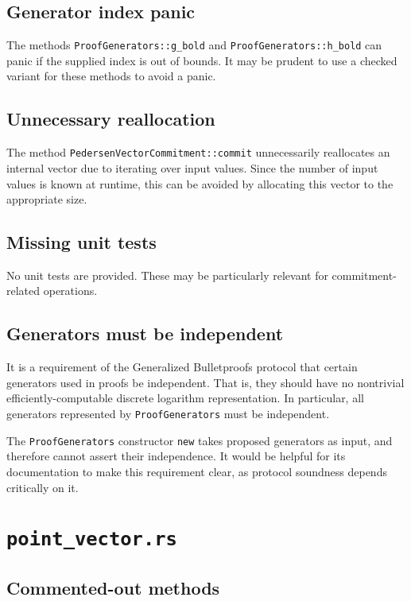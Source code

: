 \documentclass{article}
\begin{document}
\subsection{Generator index panic}

The methods \texttt{ProofGenerators::g\_bold} and \texttt{ProofGenerators::h\_bold} can panic if the supplied index is out of bounds.
It may be prudent to use a checked variant for these methods to avoid a panic.


\subsection{Unnecessary reallocation}

The method \texttt{PedersenVectorCommitment::commit} unnecessarily reallocates an internal vector due to iterating over input values.
Since the number of input values is known at runtime, this can be avoided by allocating this vector to the appropriate size.


\subsection{Missing unit tests}

No unit tests are provided.
These may be particularly relevant for commitment-related operations.


\subsection{Generators must be independent}

It is a requirement of the Generalized Bulletproofs protocol that certain generators used in proofs be independent.
That is, they should have no nontrivial efficiently-computable discrete logarithm representation.
In particular, all generators represented by \texttt{ProofGenerators} must be independent.

The \texttt{ProofGenerators} constructor \texttt{new} takes proposed generators as input, and therefore cannot assert their independence.
It would be helpful for its documentation to make this requirement clear, as protocol soundness depends critically on it.


\section{\texttt{point\_vector.rs}}

\subsection{Commented-out methods}
\end{document}
